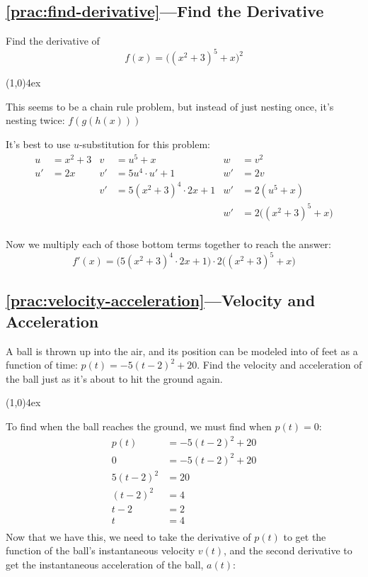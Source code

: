 \documentclass{MathNotes}
\newcommand{\br}{
	\begin{center}
		\line(1,0){4ex}
	\end{center}}
\begin{document}
\subsection*{\ref{prac:find-derivative}---Find the Derivative}\label{ans:find-derivative}
Find the derivative of $$f(x)=\big((x^2+3)^5+x\big)^2$$
\br
This seems to be a chain rule problem, but instead of just nesting once,
it's nesting twice: $f(g(h(x)))$

It's best to use $u$-substitution for this problem:
\begin{align*}
	u  & =x^2+3 & v  & =u^5+x                & w  & =v^2                    \\
	u' & =2x    & v' & =5u^4\cdot u'+1       & w' & =2v                     \\
	   &        & v' & =5(x^2+3)^4\cdot 2x+1 & w' & =2(u^5+x)               \\
	   &        &    &                       & w' & =2\big((x^2+3)^5+x\big) \\
\end{align*}

Now we multiply each of those bottom terms together to reach the answer:
$$f'(x)=\big(5(x^2+3)^4\cdot 2x+1\big)\cdot2\big((x^2+3)^5+x\big)$$

\newpage
\subsection*{\ref{prac:velocity-acceleration}---Velocity and Acceleration}\label{ans:velocity-acceleration}
A ball is thrown up into the air, and its position can be modeled into
of feet as a function of time: $p(t)=-5(t-2)^2+20$. Find the velocity and
acceleration of the ball just as it's about to hit the ground again.
\br
To find when the ball reaches the ground, we must find when $p(t)=0$:
\begin{align*}
	p(t)     & =-5(t-2)^2+20 \\
	0        & =-5(t-2)^2+20 \\
	5(t-2)^2 & =20           \\
	(t-2)^2  & =4            \\
	t-2      & =2            \\
	t        & =4            \\
\end{align*}
Now that we have this, we need to take the derivative of $p(t)$ to get the
function of the ball's instantaneous velocity $v(t)$, and the second derivative
to get the instantaneous acceleration of the ball, $a(t)$:
\end{document}
